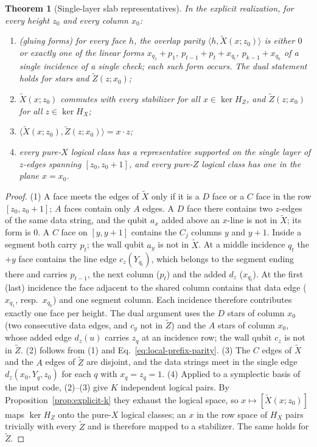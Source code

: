 \documentclass[aps,prx,reprint,superscriptaddress,nofootinbib,floatfix,longbibliography]{revtex4-2}
\newtheorem{theorem}{Theorem}[section]
\theoremstyle{definition}
\begin{document}
\begin{theorem}[Single-layer slab representatives]
\label{thm:slab-resolved}
In the explicit realization, for every height $z_0$ and every column $x_0$:
\begin{enumerate}
\item \emph{(gluing forms)} for every face $h$, the overlap parity
$\langle h,\widetilde X(x;z_0)\rangle$ is either $0$ or exactly one of the
linear forms $x_{q_1}+p_1$, $p_{t-1}+p_t+x_{q_t}$, $p_{k-1}+x_{q_k}$ of a
single incidence of a single check; each such form occurs.  The dual
statement holds for stars and $\widetilde Z(z;x_0)$;
\item $\widetilde X(x;z_0)$ commutes with every stabilizer for all
$x\in\ker H_Z$, and $\widetilde Z(z;x_0)$ for all $z\in\ker H_X$;
\item $\langle\widetilde X(x;z_0),\widetilde Z(z;x_0)\rangle=x\cdot z$;
\item every pure-$X$ logical class has a representative supported on the
single layer of $z$-edges spanning $[z_0,z_0+1]$, and every pure-$Z$ logical
class has one in the plane $x=x_0$.
\end{enumerate}
\end{theorem}
\begin{proof}
(1) A face meets the edges of $\widetilde X$ only if it is a $D$ face or a
$C$ face in the row $[z_0,z_0+1]$; $A$ faces contain only $A$ edges.  A
$D$ face there contains two $z$-edges of the same data string, and the qubit
$a_x$ added above an $x$-line is not in $\widetilde X$; its form is $0$.  A
$C$ face on $[y,y+1]$ contains the $C_j$ columns $y$ and $y+1$.  Inside a
segment both carry $p_t$; the wall qubit $a_y$ is not in $\widetilde X$.  At a
middle incidence $q_t$ the $+y$ face contains the line edge $c_z(Y_{q_t})$,
which belongs to the segment ending there and carries $p_{t-1}$, the next
column ($p_t$) and the added $d_z$ ($x_{q_t}$).  At the first (last)
incidence the face adjacent to the shared column contains that data edge
($x_{q_1}$, resp.\ $x_{q_k}$) and one segment column.  Each incidence
therefore contributes exactly one face per height.  The dual argument uses
the $D$ stars of column $x_0$ (two consecutive data edges, and $c_y$ not in
$\widetilde Z$) and the $A$ stars of column $x_0$, whose added edge
$d_z(u)$ carries $z_q$ at an incidence row; the wall qubit $c_z$ is not in
$\widetilde Z$.  (2) follows from (1) and
Eq.~\eqref{eq:local-prefix-parity}.  (3) The $C$ edges of $\widetilde X$ and
the $A$ edges of $\widetilde Z$ are disjoint, and the data strings meet in the
single edge $d_z(x_0,Y_q,z_0)$ for each $q$ with $x_q=z_q=1$.  (4) Applied to a
symplectic basis of the input code, (2)--(3) give $K$ independent logical
pairs.  By Proposition~\ref{prop:explicit-k} they exhaust the logical space,
so $x\mapsto[\widetilde X(x;z_0)]$ maps $\ker H_Z$ onto the pure-$X$
logical classes; an $x$ in the row space of $H_X$ pairs trivially with every
$\widetilde Z$ and is therefore mapped to a stabilizer.  The same holds for
$\widetilde Z$.
\end{proof}
\end{document}
